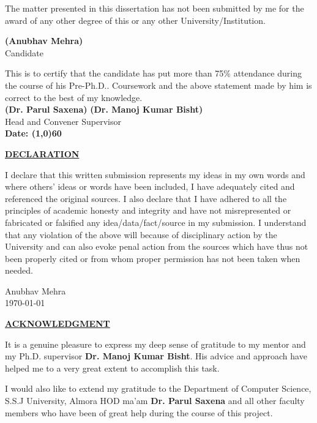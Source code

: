 \documentclass[a4paper, 12pt]{article}
\begin{document}
\begin{sloppypar}
The matter presented in this dissertation has not been submitted by me for the award of any other degree of this or any other University/Institution.
\vspace*{1cm}
\begin{flushright}
\textbf{(Anubhav Mehra)}\\
Candidate\\
\end{flushright}

This is to certify that the candidate has put more than 75\% attendance during the course of his Pre-Ph.D.. Coursework and the above  statement made by him is correct to the best of my knowledge.\\ [1cm]
\textbf{(Dr. Parul Saxena)} \hspace*{6.9cm}
\textbf{(Dr. Manoj Kumar Bisht)}\\
Head and Convener \hspace*{9.5cm} Supervisor\\ [2cm]
\textbf{Date: \line(1,0){60}}
\thispagestyle{empty}
\clearpage

\begin{center}
\textbf{\underline{DECLARATION}}
\end{center}
I declare that this written submission represents my ideas in my own words and where others' ideas or words have been included, I have adequately cited and referenced the original sources. I also declare that I have adhered to all the principles of academic honesty and integrity and have not  misrepresented or fabricated or falsified any idea/data/fact/source in my submission. I understand that any violation of the above will because of disciplinary action by the University and can also evoke penal action from the sources which have thus not been properly cited or from whom proper permission has not been taken when needed.
\begin{flushright}
Anubhav Mehra \\
\today
\end{flushright}
\thispagestyle{empty}
\clearpage

\begin{center}
\textbf{\underline{ACKNOWLEDGMENT}}
\end{center}
It is a genuine pleasure to express my deep sense of gratitude to my mentor and my Ph.D. supervisor \textbf{Dr. Manoj Kumar Bisht}. His advice and approach have helped me to a very great extent to accomplish this task. 

I would also like to extend my gratitude to the Department of Computer Science, S.S.J University, Almora HOD ma'am \textbf{Dr. Parul Saxena} and all other faculty members who have been of great help during the course of this project.


\end{sloppypar}
\end{document}
